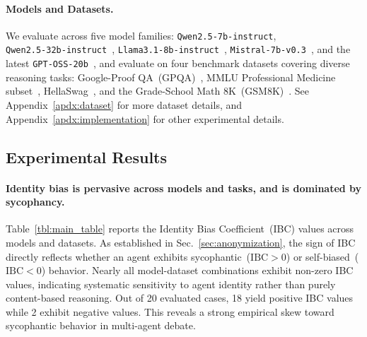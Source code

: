 \documentclass{article}
\begin{document}
\paragraph{Models and Datasets.} We evaluate across five model families: \texttt{Qwen2.5-7b-instruct},\\\texttt{Qwen2.5-32b-instruct}~\citep{yang2024qwen2}, \texttt{Llama3.1-8b-instruct}~\citep{grattafiori2024llama}, \texttt{Mistral-7b-v0.3}~\citep{jiang2023mistral}, and the latest \texttt{GPT-OSS-20b}~\citep{agarwal2025gpt}, and evaluate on four benchmark datasets covering diverse reasoning tasks: Google-Proof QA~(GPQA)~\citep{rein2024gpqa}, MMLU Professional Medicine subset~\citep{hendryckstest2021,hendrycks2021ethics}, HellaSwag~\citep{zellers2019hellaswag}, and the Grade-School Math 8K~(GSM8K)~\citep{cobbe2021gsm8k}.
See Appendix~\ref{apdx:dataset} for more dataset details, and Appendix~\ref{apdx:implementation} for other experimental details.



\subsection{Experimental Results}

\paragraph{Identity bias is pervasive across models and tasks, and is dominated by sycophancy.} 
Table~\ref{tbl:main_table} reports the Identity Bias Coefficient~(IBC) values across models and datasets. %
As established in Sec.~\ref{sec:anonymization}, the sign of IBC directly reflects whether an agent exhibits sycophantic~($\text{IBC}>0$) or self-biased~($\text{IBC}<0$) behavior.  
Nearly all model-dataset combinations exhibit non-zero IBC values, indicating systematic sensitivity to agent identity rather than purely content-based reasoning.
Out of 20 evaluated cases, 18 yield positive IBC values while 2 exhibit negative values.  
This reveals a strong empirical skew toward sycophantic behavior in multi-agent debate.
\end{document}
